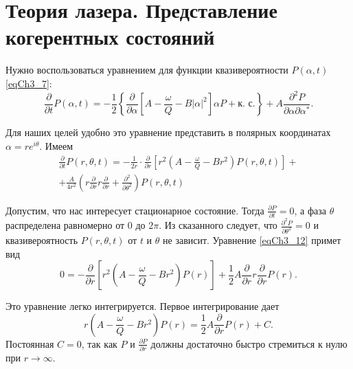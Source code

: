 \section{Теория лазера. Представление когерентных состояний}
Нужно воспользоваться уравнением для функции квазивероятности
$P\left(\alpha, t\right)$ \eqref{eqCh3_7}:
\begin{equation}
\frac{\partial}{\partial t} P\left(\alpha, t\right) = 
- \frac{1}{2}\left\{ 
\frac{\partial}{\partial \alpha}
\left[
A - \frac{\omega}{Q} - B \left|\alpha\right|^2
\right] \alpha P + \mbox{к. с.}
\right\} + 
A \frac{\partial^2 P}{\partial \alpha \partial \alpha^{*}}.
\nonumber
\end{equation} 

Для наших целей удобно это уравнение представить в полярных
координатах $\alpha = r e^{i\theta}$. Имеем 
\begin{eqnarray}
\frac{\partial}{\partial t} P\left(r, \theta, t\right) =
- \frac{1}{2 r} \cdot \frac{\partial}{\partial r}\left[
r^2\left(A - \frac{\omega}{Q} - B r^2\right)P\left(r, \theta,
t\right) 
\right] +
\nonumber \\
+ \frac{A}{4 r^2}
\left(
r \frac{\partial}{\partial r} r \frac{\partial}{\partial r} + 
\frac{\partial^2}{\partial \theta^2}
\right)
P\left(r, \theta, t\right)
\label{eqCh3_12}
\end{eqnarray}

Допустим, что нас интересует стационарное состояние. Тогда $\frac{\partial
  P}{\partial t} = 0$, а фаза $\theta$ распределена равномерно от $0$ до $2
\pi$. Из сказанного следует, что $\frac{\partial^2 P}{\partial
  \theta^2} = 0$ и квазивероятность $P\left(r, \theta, t\right)$ от $t$ и
$\theta$ не зависит. Уравнение \eqref{eqCh3_12} примет вид   
\begin{equation}
0 = - \frac{\partial}{\partial r}
\left[
r^2\left(A - \frac{\omega}{Q} - B r^2\right)P\left(r\right) 
\right] + 
\frac{1}{2} A \frac{\partial}{\partial r} r \frac{\partial}{\partial
  r} P\left(r\right).
\label{eqCh3_13}
\end{equation}

Это уравнение легко интегрируется. Первое интегрирование дает
\begin{equation}
r\left(A - \frac{\omega}{Q} - B r^2\right)P\left(r\right) 
=
\frac{1}{2} A \frac{\partial}{\partial
  r} P\left(r\right) + C.
\label{eqCh3_14}
\end{equation}
Постоянная  $C = 0$, так как $P$ и $\frac{\partial P}{\partial r}$
должны достаточно быстро стремиться к нулю при  $r \rightarrow
\infty$. 
 
